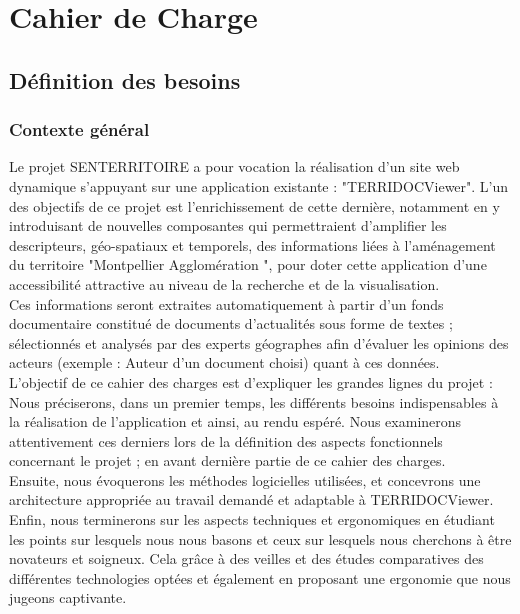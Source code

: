 \chapter{Cahier de Charge} \label{CahierCharge}



\section{Définition des besoins} \label{Besoins}

\subsection{Contexte général}

Le projet SENTERRITOIRE a pour vocation la réalisation d’un site web dynamique s'appuyant sur une application existante : "TERRIDOCViewer".  L'un des objectifs de ce projet est l'enrichissement de cette dernière, notamment en y introduisant de nouvelles composantes qui permettraient d'amplifier les descripteurs, géo-spatiaux et temporels, des informations liées à l'aménagement du territoire "Montpellier Agglomération ", pour doter cette application d'une accessibilité attractive au niveau de la recherche et de la visualisation.\\

Ces informations seront extraites automatiquement à partir d'un fonds documentaire constitué de documents d'actualités sous forme de textes ; sélectionnés et analysés par des experts géographes afin d'évaluer les opinions des acteurs (exemple : Auteur d’un document choisi) quant à ces données.\\

L'objectif de ce cahier des charges est d'expliquer les grandes lignes du projet : \\

Nous préciserons, dans un premier temps, les différents besoins indispensables à la réalisation de l'application et ainsi, au rendu espéré. Nous examinerons attentivement ces derniers lors de la définition des aspects fonctionnels concernant le projet ; en avant dernière partie de ce cahier des charges.\\

Ensuite, nous évoquerons les méthodes logicielles utilisées, et concevrons une architecture appropriée au travail demandé et adaptable à TERRIDOCViewer.\\

Enfin, nous terminerons sur les aspects  techniques et ergonomiques en étudiant les points sur lesquels nous nous basons et ceux sur lesquels nous cherchons à être novateurs et soigneux. Cela grâce à des veilles et des études comparatives des différentes technologies optées et également en proposant une ergonomie que nous jugeons captivante.\\


